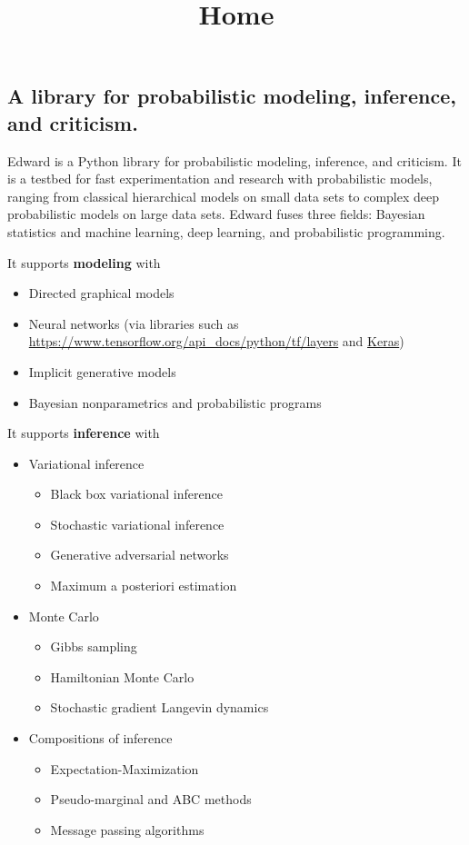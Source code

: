 \title{Home}

\subsection{A library for probabilistic modeling, inference, and criticism.}

Edward is a Python library for probabilistic modeling, inference, and
criticism. It is a testbed for fast experimentation and research with
probabilistic models, ranging from classical hierarchical models on
small data sets to complex deep probabilistic models on large data
sets. Edward fuses three fields: Bayesian statistics and machine
learning, deep learning, and probabilistic programming.

It supports \textbf{modeling} with

\begin{itemize}
\item Directed graphical models
\item Neural networks (via libraries such as
  \href{\texttt{tf.layers}}{https://www.tensorflow.org/api_docs/python/tf/layers}
  and
  \href{http://keras.io}{Keras})
\item Implicit generative models
\item Bayesian nonparametrics and probabilistic programs
\end{itemize}

It supports \textbf{inference} with

\begin{itemize}
\item Variational inference
  \begin{itemize}
    \item Black box variational inference
    \item Stochastic variational inference
    \item Generative adversarial networks
    \item Maximum a posteriori estimation
  \end{itemize}
\item Monte Carlo
  \begin{itemize}
    \item Gibbs sampling
    \item Hamiltonian Monte Carlo
    \item Stochastic gradient Langevin dynamics
  \end{itemize}
\item Compositions of inference
  \begin{itemize}
    \item Expectation-Maximization
    \item Pseudo-marginal and ABC methods
    \item Message passing algorithms
  \end{itemize}
\end{itemize}

